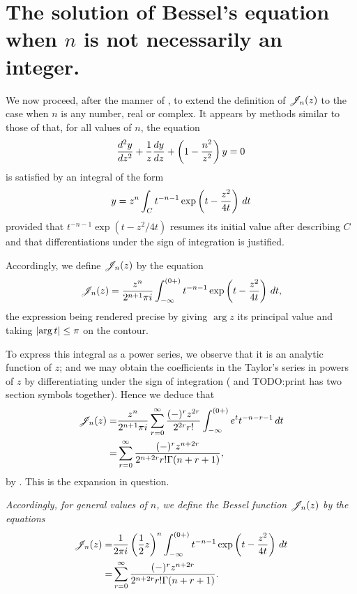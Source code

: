 \documentclass{book}
\begin{document}
\section{The solution of Bessel's equation when $n$ is not necessarily
  an integer.}
We now proceed, after the manner of , to
extend the definition of $\mathscr{J}_n(z)$ to the case when $n$ is any number,
real or complex. It appears by methods similar to those of
 that, for all values of $n$, the
equation
$$
\frac{d^2 y}{dz^2}
+ \frac{1}{z} \frac{dy}{dz}
+ \left(  1 - \frac{n^2}{z^2}   \right) y
= 0
$$
is satisfied by an integral of the form
$$
y
=
z^n
\int_C
t^{-n-1}
\exp \left(  t - \frac{z^2}{4t}   \right)
\, d t
$$
provided that $t^{-n-1}\exp(t - z^2/4t)$ resumes its initial value
after describing $C$ and that differentiations under the sign of
integration is justified.

Accordingly, we define $\mathscr{J}_n(z)$ by the equation
$$
\mathscr{J}_n(z) 
= 
\frac{z^n}{2^{n+1}\pi i}
\int_{-\infty}^{(0+)}
t^{-n-1} 
\exp\left(  t - \frac{z^2}{4t}   \right)
\, d t,
$$
the expression being rendered precise by giving
$\arg z$ its principal value and taking
$\left|  \arg t  \right| \leq \pi$ on the contour.

To express this integral as a power series, we observe that it is an
analytic function of $z$; and we may obtain the coefficients in the
Taylor's series in powers of $z$ by differentiating under the sign of 
integration
( and 
TODO:print has two section symbols together).
Hence we deduce that
\begin{align*}
  \mathscr{J}_n(z)
  =& \frac{z^n}{2^{n+1}\pi i}
  \sum_{r=0}^{\infty} \frac{ (-)^r z^{2r}  }{ 2^{2r} r!  }
  \int_{-\infty}^{(0+)}
  e^t
  t^{-n-r-1}
  \, d t
  \\
  =&
  \sum_{r=0}^{\infty}
  \frac{ (-)^r z^{n+2r}  }{ 2^{n+2r} r! \Gamma(n+r+1)  },
\end{align*}
by . This is the expansion in question.

%
%
\emph{Accordingly, for general values of $n$, we define the
  \emph{Bessel function} $\mathscr{J}_n(z)$ by the equations}
\begin{align*}
  \mathscr{J}_n(z)
  =& \frac{1}{2\pi i} \left( \frac{1}{2} z \right)^n
  \int_{-\infty}^{(0+)}
  t^{-n-1}
  \exp\left(  t - \frac{z^2}{4t}   \right)
  \, d t
  \\
  =&
  \sum_{r=0}^{\infty}
  \frac{ (-)^r z^{n+2r}  }{ 2^{n+2r} r! \Gamma(n+r+1)  }.
\end{align*}
\end{document}
